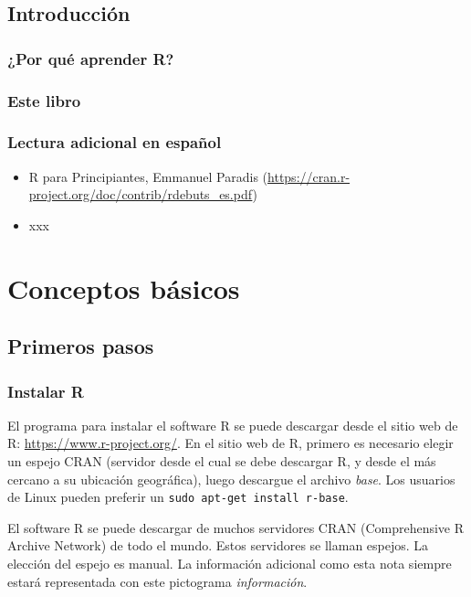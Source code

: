 \documentclass[]{book}
\makeatletter
\providecommand{\tightlist}{%
  \setlength{\itemsep}{0pt}\setlength{\parskip}{0pt}}
\newenvironment{kframe}{%
\medskip{}
\setlength{\fboxsep}{.8em}
 \def\at@end@of@kframe{}%
 \ifinner\ifhmode%
  \def\at@end@of@kframe{\end{minipage}}%
  \begin{minipage}{\columnwidth}%
 \fi\fi%
 \def\FrameCommand##1{\hskip\@totalleftmargin \hskip-\fboxsep
 \colorbox{shadecolor}{##1}\hskip-\fboxsep
     \hskip-\linewidth \hskip-\@totalleftmargin \hskip\columnwidth}%
 \MakeFramed {\advance\hsize-\width
   \@totalleftmargin\z@ \linewidth\hsize
   \@setminipage}}%
 {\par\unskip\endMakeFramed%
 \at@end@of@kframe}
\newenvironment{rmdblock}[1]
  {
  \begin{itemize}
  \renewcommand{\labelitemi}{
    \raisebox{-.7\height}[0pt][0pt]{
      {\setkeys{Gin}{width=3em,keepaspectratio}\texttt{[image: myIcons/\#1]}} %
    }
  }
  \setlength{\fboxsep}{1em}
  \begin{kframe}
  \item
  }
  {
  \end{kframe}
  \end{itemize}
  }
\newenvironment{rmdnote}      %
  {\begin{rmdblock}{note}}    %
  {\end{rmdblock}}            %
\makeatother
\begin{document}
\chapter{Introducción}\label{intro}

\section{¿Por qué aprender R?}\label{por-que-aprender-r}

\section{Este libro}\label{este-libro}

\section{Lectura adicional en
español}\label{lectura-adicional-en-espanol}

\begin{itemize}
\tightlist
\item
  R para Principiantes, Emmanuel Paradis
  (\url{https://cran.r-project.org/doc/contrib/rdebuts_es.pdf})
\item
  xxx
\end{itemize}

\part{Conceptos básicos}\label{part-conceptos-basicos}

\chapter{Primeros pasos}\label{premiersPas}

\section{Instalar R}\label{instalar-r}

El programa para instalar el software R se puede descargar desde el
sitio web de R: \url{https://www.r-project.org/}. En el sitio web de R,
primero es necesario elegir un espejo CRAN (servidor desde el cual se
debe descargar R, y desde el más cercano a su ubicación geográfica),
luego descargue el archivo \emph{base}. Los usuarios de Linux pueden
preferir un \texttt{sudo\ apt-get\ install\ r-base}.

\begin{rmdnote}
El software R se puede descargar de muchos servidores CRAN
(Comprehensive R Archive Network) de todo el mundo. Estos servidores se
llaman espejos. La elección del espejo es manual. La información
adicional como esta nota siempre estará representada con este pictograma
\emph{información}.
\end{rmdnote}
\end{document}
